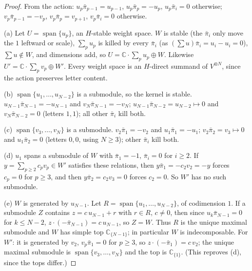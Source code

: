 \documentclass[11pt]{amsart}
\newcommand{\pib}{\bar\pi}
\newcommand{\C}{\mathbb{C}}
\theoremstyle{plain}
\theoremstyle{definition}
\begin{document}
\begin{proof}
From the action: $u_p\pib_{p-1}=u_{p-1}$, $u_p\pib_p=-u_p$, $u_p\pib_i=0$ otherwise; $v_p\pib_{p-1}=-v_p$, $v_p\pib_p=v_{p+1}$, $v_p\pib_i=0$ otherwise.

(a) Let $U=\operatorname{span}\{u_p\}$, an $H$-stable weight space. $W$ is stable (the $\pib_i$ only move the $1$ leftward or scale), $\sum_pu_p$ is killed by every $\pib_i$ (as $(\sum u)\pib_i=u_i-u_i=0$), $\sum u\notin W$, and dimensions add, so $U=\C\cdot\sum_pu_p\oplus W$. Likewise $U'=\C\cdot\sum_pv_p\oplus W'$. Every weight space is an $H$-direct summand of $V^{\otimes N}$, since the action preserves letter content.

(b) $\operatorname{span}\{u_1,\dots,u_{N-2}\}$ is a submodule, so the kernel is stable. $u_{N-1}\pib_{N-1}=-u_{N-1}$ and $v_N\pib_{N-1}=-v_N$; $u_{N-1}\pib_{N-2}=u_{N-2}\mapsto0$ and $v_N\pib_{N-2}=0$ (letters $1,1$); all other $\pib_i$ kill both.

(c) $\operatorname{span}\{v_3,\dots,v_N\}$ is a submodule. $v_2\pib_1=-v_2$ and $u_1\pib_1=-u_1$; $v_2\pib_2=v_3\mapsto0$ and $u_1\pib_2=0$ (letters $0,0$, using $N\ge3$); other $\pib_i$ kill both.

(d) $u_1$ spans a submodule of $W$ with $\pib_1=-1$, $\pib_i=0$ for $i\ge2$. If $y=\sum_{p\ge2}c_pv_p\in W'$ satisfies these relations, then $y\pib_1=-c_2v_2=-y$ forces $c_p=0$ for $p\ge3$, and then $y\pib_2=c_2v_3=0$ forces $c_2=0$. So $W'$ has no such submodule.

(e) $W$ is generated by $u_{N-1}$. Let $R=\operatorname{span}\{u_1,\dots,u_{N-2}\}$, of codimension $1$. If a submodule $Z$ contains $z=c\,u_{N-1}+r$ with $r\in R$, $c\ne0$, then since $u_k\pib_{N-1}=0$ for $k\le N-2$, $z\cdot(-\pib_{N-1})=c\,u_{N-1}$, so $Z=W$. Thus $R$ is the unique maximal submodule and $W$ has simple top $\C_{\{N-1\}}$; in particular $W$ is indecomposable. For $W'$: it is generated by $v_2$, $v_p\pib_1=0$ for $p\ge3$, so $z\cdot(-\pib_1)=c\,v_2$; the unique maximal submodule is $\operatorname{span}\{v_3,\dots,v_N\}$ and the top is $\C_{\{1\}}$. (This reproves (d), since the tops differ.)
\end{proof}
\end{document}
